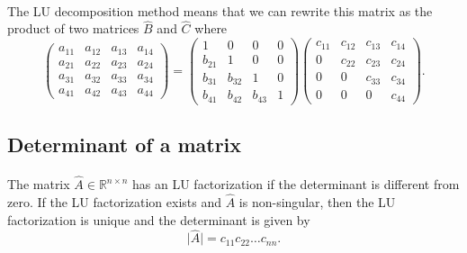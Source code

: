 \documentclass[%
twoside,                 %
final,                   %
10pt]{article}
\begin{document}
\paragraph{}
The LU decomposition method means that we can rewrite
this matrix as the product of two matrices $\hat{B}$ and $\hat{C}$
where 
\[
   \left(\begin{array}{cccc}
                          a_{11} & a_{12} & a_{13} & a_{14} \\
                          a_{21} & a_{22} & a_{23} & a_{24} \\
                          a_{31} & a_{32} & a_{33} & a_{34} \\
                          a_{41} & a_{42} & a_{43} & a_{44} 
                      \end{array} \right)
                      = \left( \begin{array}{cccc}
                              1  & 0      & 0      & 0 \\
                          b_{21} & 1      & 0      & 0 \\
                          b_{31} & b_{32} & 1      & 0 \\
                          b_{41} & b_{42} & b_{43} & 1 
                      \end{array} \right) 
                        \left( \begin{array}{cccc}
                          c_{11} & c_{12} & c_{13} & c_{14} \\
                               0 & c_{22} & c_{23} & c_{24} \\
                               0 & 0      & c_{33} & c_{34} \\
                               0 & 0      &  0     & c_{44} 
             \end{array} \right).
\]



\subsection*{Determinant of a matrix}

\paragraph{}

The matrix $\hat{A}\in \mathbb{R}^{n\times n}$ has an LU factorization if the determinant 
is different from zero. If the LU factorization exists and $\hat{A}$ is non-singular, then the LU factorization
is unique and the determinant is given by 
\[
\vert\hat{A}\vert
  = c_{11}c_{22}\dots c_{nn}.
\]
\end{document}
